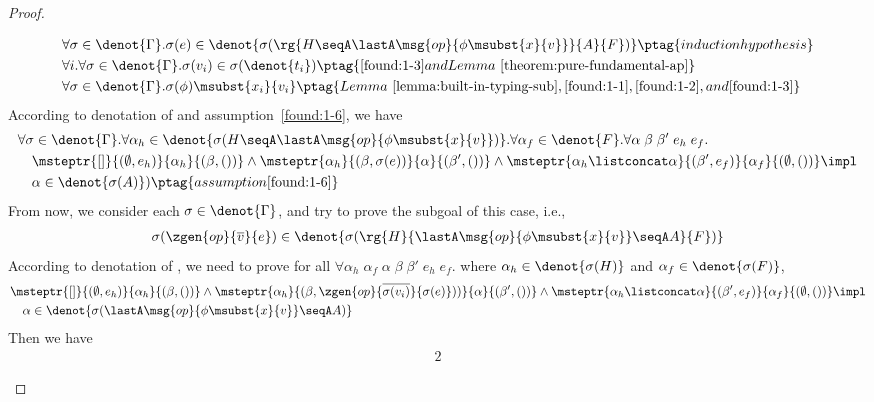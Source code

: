 \begin{proof}
\begin{enumerate}[label=Case]
{\begin{alignat}{2}
&\forall \sigma \in \denot{\Gamma}. \sigma(e) \in \denot{\sigma(\rg{H \seqA \lastA\msg{op}{\phi\msubst{x}{v}}}{A}{F})} \ptag{induction hypothesis} \label{found:1-6} \\
&\forall i. \forall \sigma \in \denot{\Gamma}. \sigma(v_i) \in  \sigma(\denot{t_i}) \ptag{\ref{found:1-3} and Lemma~\ref{theorem:pure-fundamental-ap}} \label{found:1-7} \\
&\forall \sigma \in \denot{\Gamma}. \sigma(\phi)\msubst{x_i}{v_i} \ptag{Lemma~\ref{lemma:built-in-typing-sub}, \ref{found:1-1}, \ref{found:1-2}, and \ref{found:1-3}} \label{found:1-8}
\end{alignat}}\noindent
According to denotation of \PAT and assumption~\ref{found:1-6}, we have
{\footnotesize\begin{alignat}{2}
&\forall \sigma \in \denot{\Gamma}. \forall \alpha_h \in\denot{\sigma(H \seqA \lastA\msg{op}{\phi\msubst{x}{v}})}.\forall \alpha_f \in\denot{F}. \forall \alpha\;\beta\;\beta'\;e_h\;e_f. \notag
\\&\quad \msteptr{[]}{(\emptyset, e_h)}{\alpha_h}{(\beta, ())} \land \msteptr{\alpha_h}{(\beta, \sigma(e))}{\alpha}{(\beta', ())} \land \msteptr{\alpha_h \listconcat \alpha }{(\beta', e_f)}{\alpha_f}{(\emptyset, ())} \impl \notag
\\&\quad \alpha \in\denot{\sigma(A)}) \ptag{assumption \ref{found:1-6}} \label{found:1-9}
\end{alignat}}\noindent
From now, we consider each $\sigma \in \denot{\Gamma}$, and try to prove the subgoal of this case, i.e.,
{\footnotesize\begin{align*}
    \sigma(\zgen{op}{\overline{v}}{e}) \in \denot{\sigma(\rg{H}{\lastA\msg{op}{\phi\msubst{x}{v}} \seqA A}{F})}
\end{align*}}\noindent
According to denotation of \PAT, we need to prove for all $\forall \alpha_h\;\alpha_f\;\alpha\;\beta\;\beta'\;e_h\;e_f.$ where $\alpha_h \in \denot{\sigma(H)}$ and $\alpha_f \in \denot{\sigma(F)}$,
{\footnotesize\begin{align*}
&\msteptr{[]}{(\emptyset, e_h)}{\alpha_h}{(\beta, ())} \land \msteptr{\alpha_h}{(\beta, \zgen{op}{\overline{\sigma(v_i)}}{\sigma(e)}))}{\alpha}{(\beta', ())} \land \msteptr{\alpha_h \listconcat \alpha }{(\beta', e_f)}{\alpha_f}{(\emptyset, ())} \impl \notag
\\&\quad \alpha \in\denot{\sigma(\lastA\msg{op}{\phi\msubst{x}{v}} \seqA A)}
\end{align*}}\noindent
Then we have
{\footnotesize\begin{alignat}{2}

\end{alignat}}
\end{enumerate}
\end{proof}
